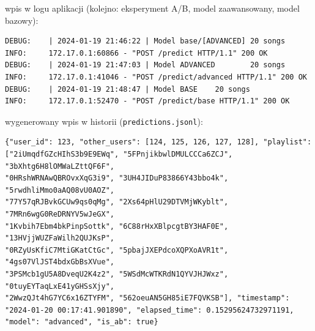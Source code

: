 \documentclass[10pt,a4paper]{article}
\begin{document}
wpis w logu aplikacji (kolejno: eksperyment A/B, model zaawansowany, model bazowy):

\begin{verbatim}
DEBUG:    | 2024-01-19 21:46:22 | Model base/[ADVANCED] 20 songs
INFO:     172.17.0.1:60866 - "POST /predict HTTP/1.1" 200 OK
DEBUG:    | 2024-01-19 21:47:03 | Model ADVANCED        20 songs
INFO:     172.17.0.1:41046 - "POST /predict/advanced HTTP/1.1" 200 OK
DEBUG:    | 2024-01-19 21:48:47 | Model BASE    20 songs
INFO:     172.17.0.1:52470 - "POST /predict/base HTTP/1.1" 200 OK
\end{verbatim}

wygenerowany wpis w historii (\texttt{predictions.jsonl}):
\begin{verbatim}
{"user_id": 123, "other_users": [124, 125, 126, 127, 128], "playlist": 
["2iUmqdfGZcHIhS3b9E9EWq", "5FPnjikbwlDMULCCCa6ZCJ", "3bXhtg6H8lOMWaLZttQF6F", 
"0HRshWRNAwQBROvxXqG3i9", "3UH4JIDuP83866Y43bbo4k", "5rwdhliMmo0aAQ08vU0AOZ", 
"77Y57qRJBvkGCUw9qs0qMg", "2Xs64pHlU29DTVMjWKyblt", "7MRn6wgG0ReDRNYV5wJeGX", 
"1Kvbih7Ebm4bkPinpSottk", "6C88rHxXBlpcgtBY3HAF0E", "13HVjjWUZFaWilh2QUJKsP", 
"0RZyUsKfiC7MtiGKatCtGc", "5pbajJXEPdcoXQPXoAVR1t", "4gs07VlJST4bdxGbBsXVue", 
"3PSMcb1gU5A8DveqU2K4z2", "5WSdMcWTKRdN1QYVJHJWxz", "0tuyEYTaqLxE41yGHSsXjy", 
"2WwzQJt4hG7YC6x16ZTYFM", "562oeuAN5GH85iE7FQVKSB"], "timestamp": 
"2024-01-20 00:17:41.901890", "elapsed_time": 0.15295624732971191,
"model": "advanced", "is_ab": true}

\end{verbatim}
\end{document}
